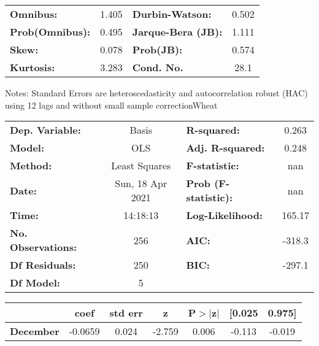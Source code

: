 \begin{center}
\begin{tabular}{lcccccc}
\bottomrule
\end{tabular}
\begin{tabular}{lclc}
\textbf{Omnibus:}       &  1.405 & \textbf{  Durbin-Watson:     } &    0.502  \\
\textbf{Prob(Omnibus):} &  0.495 & \textbf{  Jarque-Bera (JB):  } &    1.111  \\
\textbf{Skew:}          &  0.078 & \textbf{  Prob(JB):          } &    0.574  \\
\textbf{Kurtosis:}      &  3.283 & \textbf{  Cond. No.          } &     28.1  \\
\bottomrule
\end{tabular}
\end{center}

Notes: \newline
 [1] Standard Errors are heteroscedasticity and autocorrelation robust (HAC) using 12 lags and without small sample correctionWheat\begin{center}
\begin{tabular}{lclc}
\toprule
\textbf{Dep. Variable:}    &      Basis       & \textbf{  R-squared:         } &     0.263   \\
\textbf{Model:}            &       OLS        & \textbf{  Adj. R-squared:    } &     0.248   \\
\textbf{Method:}           &  Least Squares   & \textbf{  F-statistic:       } &       nan   \\
\textbf{Date:}             & Sun, 18 Apr 2021 & \textbf{  Prob (F-statistic):} &      nan    \\
\textbf{Time:}             &     14:18:13     & \textbf{  Log-Likelihood:    } &    165.17   \\
\textbf{No. Observations:} &         256      & \textbf{  AIC:               } &    -318.3   \\
\textbf{Df Residuals:}     &         250      & \textbf{  BIC:               } &    -297.1   \\
\textbf{Df Model:}         &           5      & \textbf{                     } &             \\
\bottomrule
\end{tabular}
\begin{tabular}{lcccccc}
                   & \textbf{coef} & \textbf{std err} & \textbf{z} & \textbf{P$> |$z$|$} & \textbf{[0.025} & \textbf{0.975]}  \\
\midrule
\textbf{December}  &      -0.0659  &        0.024     &    -2.759  &         0.006        &       -0.113    &       -0.019     \\

\end{tabular}
\end{center}
